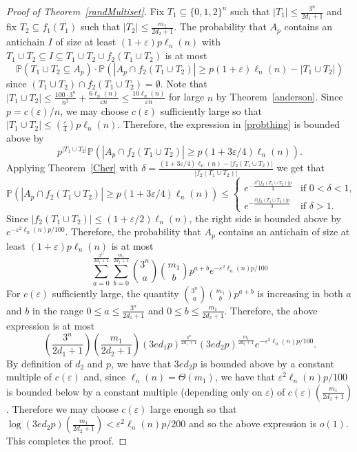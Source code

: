 \documentclass[11 pt]{article}
\theoremstyle{definition}
\theoremstyle{case}
\numberwithin{equation}{section}
\begin{document}
\begin{proof}[Proof of Theorem~\ref{randMultiset}]
Fix $T_1\subseteq\{0,1,2\}^n$ such that $|T_1|\leq \frac{3^n}{2d_1+1}$ and fix $T_2\subseteq f_1(T_1)$ such that $|T_2|\leq \frac{m_1}{2d_2+1}$. The probability that $A_p$ contains an antichain $I$ of size at least $(1+\varepsilon)p\ell_n(n)$ with $T_1\cup T_2\subseteq I\subseteq T_1\cup T_2\cup f_2(T_1\cup T_2)$ is at most
\begin{equation}\label{probthing}\mathbb{P}(T_1\cup T_2\subseteq A_p)\cdot\mathbb{P}\left(\left|A_p\cap f_2\left(T_1\cup T_2\right)\right|\geq p(1+\varepsilon)\ell_n(n) - |T_1\cup T_2|\right)\end{equation}
since $\left(T_1\cup T_2\right)\cap f_2\left(T_1\cup T_2\right)=\emptyset$. Note that $|T_1\cup T_2|\leq \frac{100\cdot3^n}{n^2} + \frac{6\ell_n(n)}{\varepsilon n} \leq \frac{10\ell_n(n)}{\varepsilon n}$ for large $n$ by Theorem~\ref{anderson}. Since $p=c(\varepsilon)/n$, we may choose $c(\varepsilon)$ sufficiently large so that $|T_1\cup T_2|\leq \left(\frac{\varepsilon}{4}\right)p\ell_n(n)$. Therefore, the expression in \eqref{probthing} is bounded above by
\[p^{|T_1\cup T_2|}\mathbb{P}\left(|A_p\cap f_2(T_1\cup T_2)|\geq p(1+3\varepsilon/4)\ell_n(n)\right).\]
Applying Theorem~\ref{Cher} with $\delta=\frac{(1+3\varepsilon/4)\ell_n(n) - |f_2(T_1\cup T_2)|}{|f_2(T_1\cup T_2)|}$ we get that
\[\mathbb{P}\left(|A_p\cap f_2(T_1\cup T_2)|\geq p(1+3\varepsilon/4)\ell_n(n)\right)\leq \begin{cases}  e^{-\frac{\delta^2\left|f_2(T_1\cup T_2)\right|p}{3}}& \text{if }0<\delta<1, \\
						  e^{-\frac{\delta\left|f_2(T_1\cup T_2)\right|p}{3}}& \text{if }\delta>1.\end{cases}\]
Since $\left|f_2\left(T_1\cup T_2\right)\right|\leq (1+\varepsilon/2)\ell_n(n)$, the right side is bounded above by $e^{-\varepsilon^2\ell_n(n)p/100}$. Therefore, the probability that $A_p$ contains an antichain of size at least $(1+\varepsilon)p\ell_n(n)$ is at most
\[\sum_{a=0}^{\frac{3^n}{2d_1+1}}\sum_{b=0}^{\frac{m_1}{2d_2+1}}\binom{3^n}{a}\binom{m_1}{b}p^{a+b}e^{-\varepsilon^2\ell_n(n)p/100}\]
For $c(\varepsilon)$ sufficiently large, the quantity $\binom{3^n}{a}\binom{m_1}{b}p^{a+b}$ is increasing in both $a$ and $b$ in the range $0\leq a\leq \frac{3^n}{2d_1+1}$ and $0\leq b\leq \frac{m_1}{2d_2+1}$. Therefore, the above expression is at most
\[ \left(\frac{3^n}{2d_1+1}\right)\left(\frac{m_1}{2d_2+1}\right)\left(3ed_1p\right)^{\frac{3^n}{2d_1+1}}\left(3ed_2p\right)^{\frac{m_1}{2d_2+1}}e^{-\varepsilon^2\ell_n(n)p/100}.\]
By definition of $d_2$ and $p$, we have that $3ed_2p$ is bounded above by a constant multiple of $c(\varepsilon)$ and, since $\ell_n(n) = \Theta\left(m_1\right)$, we have that $\varepsilon^2\ell_n(n)p/100$ is bounded below by a constant multiple (depending only on $\varepsilon$) of $c(\varepsilon)\left(\frac{m_1}{2d_2+1}\right)$. Therefore we may choose $c(\varepsilon)$ large enough so that $\log(3ed_2p)\left(\frac{m_1}{2d_2+1}\right)< \varepsilon^2\ell_n(n)p/200$ and so the above expression is $o(1)$. This completes the proof. 
\end{proof}
\end{document}
